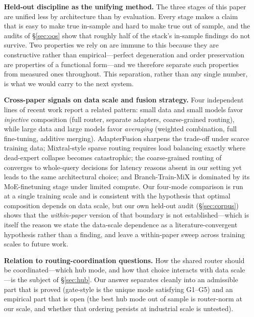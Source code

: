 \documentclass[10pt]{article}
\theoremstyle{definition}
\theoremstyle{plain}
\theoremstyle{remark}
\begin{document}
\textbf{Held-out discipline as the unifying method.} The three stages of this paper are unified less by architecture than by evaluation. Every stage makes a claim that is easy to make true in-sample and hard to make true out of sample, and the audits of \S\ref{sec:oos} show that roughly half of the stack's in-sample findings do not survive. Two properties we rely on are immune to this because they are constructive rather than empirical---perfect degeneration and order preservation are properties of a functional form---and we therefore separate such properties from measured ones throughout. This separation, rather than any single number, is what we would carry to the next system.

\textbf{Cross-paper signals on data scale and fusion strategy.} Four independent lines of recent work report a related pattern: small data and small models favor \emph{injective} composition (full router, separate adapters, coarse-grained routing), while large data and large models favor \emph{averaging} (weighted combination, full fine-tuning, additive merging). AdapterFusion \citep{pfeiffer2021} sharpens the trade-off under scarce training data; Mixtral-style sparse routing \citep{jiang2024mixtral} requires load balancing exactly where dead-expert collapse becomes catastrophic; the coarse-grained routing of \citet{liu2026orchestrating} converges to whole-query decisions for latency reasons absent in our setting yet leads to the same architectural choice; and Branch-Train-MiX \citep{sukhbaatar2024btx} is dominated by its MoE-finetuning stage under limited compute. Our four-mode comparison is run at a single training scale and is consistent with the hypothesis that optimal composition depends on data scale, but our own held-out audit (\S\ref{sec:corpus}) shows that the \emph{within-paper} version of that boundary is not established---which is itself the reason we state the data-scale dependence as a literature-convergent hypothesis rather than a finding, and leave a within-paper sweep across training scales to future work.

\textbf{Relation to routing-coordination questions.} How the shared router should be coordinated---which hub mode, and how that choice interacts with data scale---is the subject of \S\ref{sec:hub}. Our answer separates cleanly into an admissible part that is proved (gate-style is the unique mode satisfying G1--G5) and an empirical part that is open (the best hub mode out of sample is router-norm at our scale, and whether that ordering persists at industrial scale is untested).
\end{document}
